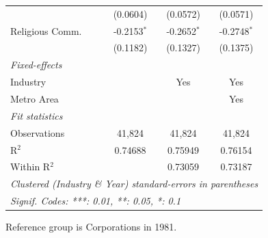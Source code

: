 \documentclass[
  12pt]{article}
\theoremstyle{definition}
\theoremstyle{remark}
\begin{document}
\begin{table}
\begin{minipage}{\linewidth}
\begin{tabular}{lccc}
                     & (0.0604)       & (0.0572)       & (0.0571)\\   
   Religious Comm.   & -0.2153$^{*}$  & -0.2652$^{*}$  & -0.2748$^{*}$\\   
                     & (0.1182)       & (0.1327)       & (0.1375)\\   
   \midrule
   \emph{Fixed-effects}\\
   Industry          &                & Yes            & Yes\\  
   Metro Area        &                &                & Yes\\  
   \midrule
   \emph{Fit statistics}\\
   Observations      & 41,824         & 41,824         & 41,824\\  
   R$^2$             & 0.74688        & 0.75949        & 0.76154\\  
   Within R$^2$      &                & 0.73059        & 0.73187\\  
   \midrule \midrule
   \multicolumn{4}{l}{\emph{Clustered (Industry \& Year) standard-errors in parentheses}}\\
   \multicolumn{4}{l}{\emph{Signif. Codes: ***: 0.01, **: 0.05, *: 0.1}}\\
\end{tabular}

\end{minipage}%
\newline
\begin{minipage}{\linewidth}

\par \raggedright

\end{minipage}%
\newline
\begin{minipage}{\linewidth}

Reference group is Corporations in 1981.

\end{minipage}%
\newline
\begin{minipage}{\linewidth}

\par\endgroup

\end{minipage}%

\end{table}%
\end{document}
